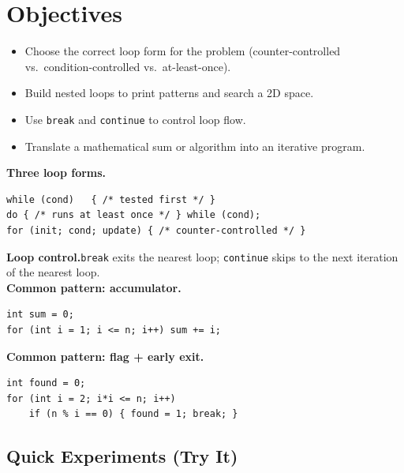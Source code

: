 \documentclass[11pt]{article}
\begin{document}
\labheader

\section*{Objectives}
\begin{itemize}[leftmargin=*,nosep]
  \item Choose the correct loop form for the problem (counter-controlled vs.\ condition-controlled vs.\ at-least-once).
  \item Build nested loops to print patterns and search a 2D space.
  \item Use \texttt{break} and \texttt{continue} to control loop flow.
  \item Translate a mathematical sum or algorithm into an iterative program.
\end{itemize}

\begin{summary}
\textbf{Three loop forms.}
\begin{lstlisting}
while (cond)   { /* tested first */ }
do { /* runs at least once */ } while (cond);
for (init; cond; update) { /* counter-controlled */ }
\end{lstlisting}

\textbf{Loop control.}\quad \texttt{break} exits the nearest loop; \texttt{continue} skips
to the next iteration of the nearest loop.\\
\textbf{Common pattern: accumulator.}
\begin{lstlisting}
int sum = 0;
for (int i = 1; i <= n; i++) sum += i;
\end{lstlisting}
\textbf{Common pattern: flag + early exit.}
\begin{lstlisting}
int found = 0;
for (int i = 2; i*i <= n; i++)
    if (n % i == 0) { found = 1; break; }
\end{lstlisting}
\end{summary}

\subsection*{Quick Experiments (Try It)}
\end{document}
